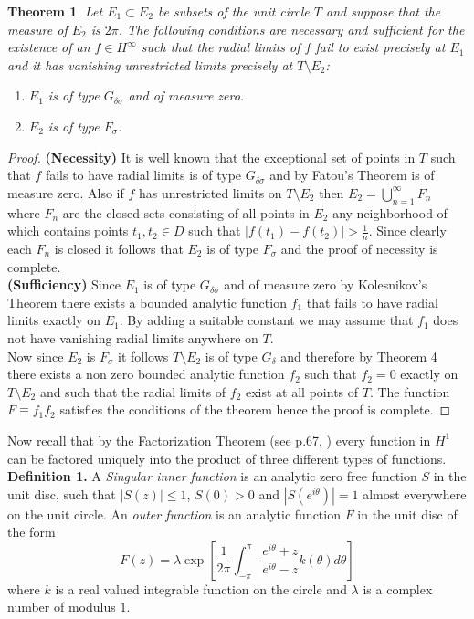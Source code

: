 \documentclass[12pt]{article}
\newtheorem{theorem}{Theorem}
\begin{document}
\begin{theorem} Let $E_1\subset E_2$ be subsets of the unit circle $T$ and suppose that the measure of $E_2$ is $2\pi$. The following conditions are necessary and sufficient for the existence of an $f\in H^\infty$ such that the radial limits of $f$ fail to exist precisely at $E_1$ and it has vanishing unrestricted limits precisely at $T\setminus E_2$:
\begin{enumerate}
\item $E_1$ is of type $G_{\delta\sigma}$ and of measure zero.
\item $E_2$ is of type $F_\sigma$.
\end{enumerate}
\end{theorem}

\begin{proof}
\textbf{(Necessity)} It is well known that the exceptional set of points in $T$ such that $f$ fails to have radial
 limits is of type $G_{\delta\sigma}$ and by {Fatou's Theorem} is of measure zero. 
 Also if $f$ has unrestricted limits on $T\setminus E_2$ then $E_2=\bigcup_{n=1}^{\infty} F_n$ where $F_n$ are the closed sets consisting 
 of all points in $E_2$ any neighborhood of which contains points $t_1,t_2\in D$ such that $|f(t_1)-f(t_2)|>\frac{1}{n}$. Since clearly each $F_n$ is closed it follows that $E_2$ is of type $F_{\sigma}$ and the proof of necessity is complete.\\
\textbf{(Sufficiency)} Since $E_1$ is of type $G_{\delta\sigma}$ and of measure zero by {Kolesnikov's Theorem} there exists a bounded analytic function $f_1$ that fails to have radial limits exactly on $E_1$. By adding a suitable constant we may assume that $f_1$ does not have vanishing radial limits anywhere on $T$.\\
 Now since $E_2$ is $F_\sigma$ it follows $T\setminus E_2$ is of type $G_\delta$ and therefore by {Theorem 4} there exists a non zero bounded analytic function $f_2$ such that $f_2=0$ exactly on $T\setminus E_2$ and such that the radial limits of $f_2$ exist at all points of $T$.
The function $F\equiv f_1f_2$ satisfies the conditions of the theorem hence the proof is complete. 
\end{proof}

\noindent Now recall that by the Factorization Theorem (see p.67, \cite{HO}) every function in $H^1$ can be factored uniquely into the product of three different types of functions. \\
 
 \noindent\textbf{Definition 1.}
A \emph{Singular inner function} is an analytic zero free function $S$ in the unit disc, such that $|S(z)|\leq 1$, $S(0)>0$ and $|S(e^{i\theta})|=1$ almost everywhere on the unit circle. An \emph{outer function} is an analytic function $F$ in the unit disc of the form $$F(z)=\lambda \exp\left[ \frac{1}{2\pi}\int_{-\pi}^{\pi}\frac{e^{i\theta}+z}{e^{i\theta}-z}k(\theta)d\theta\right]$$
where $k$ is a real valued integrable function on the circle and $\lambda$ is a complex number of modulus $1$.\\
 
\end{document}
